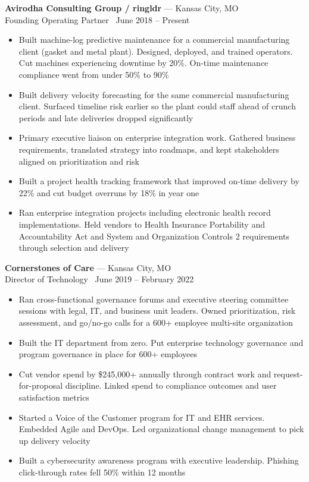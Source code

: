 \documentclass[10pt]{article}
\newcommand{\roleheader}[4]{%
  \noindent\textbf{#1} --- #2\\
  #3 \textperiodcentered\ #4\par\vspace{0.04in}
}
\begin{document}
\roleheader{Avirodha Consulting Group / ringldr}{Kansas City, MO}{Founding Operating Partner}{June 2018 -- Present}
\begin{itemize}
  \item Built machine-log predictive maintenance for a commercial manufacturing client (gasket and metal plant). Designed, deployed, and trained operators. Cut machines experiencing downtime by 20\%. On-time maintenance compliance went from under 50\% to 90\%
  \item Built delivery velocity forecasting for the same commercial manufacturing client. Surfaced timeline risk earlier so the plant could staff ahead of crunch periods and late deliveries dropped significantly
  \item Primary executive liaison on enterprise integration work. Gathered business requirements, translated strategy into roadmaps, and kept stakeholders aligned on prioritization and risk
  \item Built a project health tracking framework that improved on-time delivery by 22\% and cut budget overruns by 18\% in year one
  \item Ran enterprise integration projects including electronic health record implementations. Held vendors to Health Insurance Portability and Accountability Act and System and Organization Controls 2 requirements through selection and delivery
\end{itemize}

\roleheader{Cornerstones of Care}{Kansas City, MO}{Director of Technology}{June 2019 -- February 2022}
\begin{itemize}
  \item Ran cross-functional governance forums and executive steering committee sessions with legal, IT, and business unit leaders. Owned prioritization, risk assessment, and go/no-go calls for a 600+ employee multi-site organization
  \item Built the IT department from zero. Put enterprise technology governance and program governance in place for 600+ employees
  \item Cut vendor spend by \$245,000+ annually through contract work and request-for-proposal discipline. Linked spend to compliance outcomes and user satisfaction metrics
  \item Started a Voice of the Customer program for IT and EHR services. Embedded Agile and DevOps. Led organizational change management to pick up delivery velocity
  \item Built a cybersecurity awareness program with executive leadership. Phishing click-through rates fell 50\% within 12 months
\end{itemize}
\end{document}
